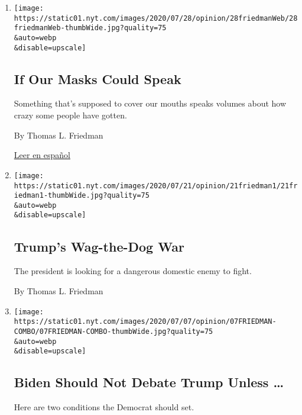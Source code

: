 \begin{enumerate}
\def\labelenumi{\arabic{enumi}.}
\item
  \href{/2020/07/28/opinion/coronavirus-masks.html}{}

  \texttt{[image: https://static01.nyt.com/images/2020/07/28/opinion/28friedmanWeb/28friedmanWeb-thumbWide.jpg?quality=75\\\&auto=webp\\\&disable=upscale]}

  \hypertarget{if-our-masks-could-speak}{%
  \subsection{If Our Masks Could Speak}\label{if-our-masks-could-speak}}

  Something that's supposed to cover our mouths speaks volumes about how
  crazy some people have gotten.

  By Thomas L. Friedman

  \href{https://www.nytimes.com/es/2020/07/30/espanol/opinion/usar-cubrebocas-politica.html}{Leer
  en español}
\item
  \href{/2020/07/21/opinion/trump-portland-syria.html}{}

  \texttt{[image: https://static01.nyt.com/images/2020/07/21/opinion/21friedman1/21friedman1-thumbWide.jpg?quality=75\\\&auto=webp\\\&disable=upscale]}

  \hypertarget{trumps-wag-the-dog-war}{%
  \subsection{Trump's Wag-the-Dog War}\label{trumps-wag-the-dog-war}}

  The president is looking for a dangerous domestic enemy to fight.

  By Thomas L. Friedman
\item
  \href{/2020/07/07/opinion/biden-trump-debate.html}{}

  \texttt{[image: https://static01.nyt.com/images/2020/07/07/opinion/07FRIEDMAN-COMBO/07FRIEDMAN-COMBO-thumbWide.jpg?quality=75\\\&auto=webp\\\&disable=upscale]}

  \hypertarget{biden-should-not-debate-trump-unless-}{%
  \subsection{Biden Should Not Debate Trump Unless
  \ldots{}}\label{biden-should-not-debate-trump-unless-}}

  Here are two conditions the Democrat should set.


\end{enumerate}
